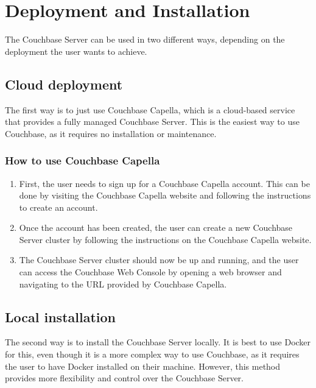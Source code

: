 \chapter{Deployment and Installation}

The Couchbase Server can be used in two different ways, depending on the deployment the user wants to achieve. 

\section{Cloud deployment}
The first way is to just use Couchbase Capella, which is a cloud-based service that provides a fully managed Couchbase Server. This is the easiest way to use Couchbase, as it requires no installation or maintenance.

\subsection{How to use Couchbase Capella}
\begin{enumerate}
    \item First, the user needs to sign up for a Couchbase Capella account. This can be done by visiting the Couchbase Capella website and following the instructions to create an account. \cite{couchbaseCapellaSignUp}
    \item Once the account has been created, the user can create a new Couchbase Server cluster by following the instructions on the Couchbase Capella website.
    \item The Couchbase Server cluster should now be up and running, and the user can access the Couchbase Web Console by opening a web browser and navigating to the URL provided by Couchbase Capella.
\end{enumerate}


\section{Local installation}
The second way is to install the Couchbase Server locally. It is best to use Docker for this, even though it is a more complex way to use Couchbase, as it requires the user to have Docker installed on their machine. However, this method provides more flexibility and control over the Couchbase Server.


